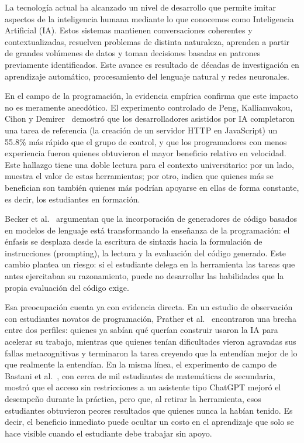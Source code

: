\documentclass[12pt,letterpaper]{article}
\numberwithin{table}{section}
\numberwithin{figure}{section}
\begin{document}
La tecnología actual ha alcanzado un nivel de desarrollo que permite imitar aspectos de la inteligencia humana mediante lo que conocemos como Inteligencia Artificial (IA). Estos sistemas mantienen conversaciones coherentes y contextualizadas, resuelven problemas de distinta naturaleza, aprenden a partir de grandes volúmenes de datos y toman decisiones basadas en patrones previamente identificados. Este avance es resultado de décadas de investigación en aprendizaje automático, procesamiento del lenguaje natural y redes neuronales.

En el campo de la programación, la evidencia empírica confirma que este impacto no es meramente anecdótico. El experimento controlado de Peng, Kalliamvakou, Cihon y Demirer~\cite{peng2023impact} demostró que los desarrolladores asistidos por IA completaron una tarea de referencia (la creación de un servidor HTTP en JavaScript) un 55.8\% más rápido que el grupo de control, y que los programadores con menos experiencia fueron quienes obtuvieron el mayor beneficio relativo en velocidad. Este hallazgo tiene una doble lectura para el contexto universitario: por un lado, muestra el valor de estas herramientas; por otro, indica que quienes más se benefician son también quienes más podrían apoyarse en ellas de forma constante, es decir, los estudiantes en formación.

Becker et al.~\cite{becker2023programming} argumentan que la incorporación de generadores de código basados en modelos de lenguaje está transformando la enseñanza de la programación: el énfasis se desplaza desde la escritura de sintaxis hacia la formulación de instrucciones (prompting), la lectura y la evaluación del código generado. Este cambio plantea un riesgo: si el estudiante delega en la herramienta las tareas que antes ejercitaban su razonamiento, puede no desarrollar las habilidades que la propia evaluación del código exige.

Esa preocupación cuenta ya con evidencia directa. En un estudio de observación con estudiantes novatos de programación, Prather et al.~\cite{prather2024widening} encontraron una brecha entre dos perfiles: quienes ya sabían qué querían construir usaron la IA para acelerar su trabajo, mientras que quienes tenían dificultades vieron agravadas sus fallas metacognitivas y terminaron la tarea creyendo que la entendían mejor de lo que realmente la entendían. En la misma línea, el experimento de campo de Bastani et al.~\cite{bastani2025generative}, con cerca de mil estudiantes de matemáticas de secundaria, mostró que el acceso sin restricciones a un asistente tipo ChatGPT mejoró el desempeño durante la práctica, pero que, al retirar la herramienta, esos estudiantes obtuvieron peores resultados que quienes nunca la habían tenido. Es decir, el beneficio inmediato puede ocultar un costo en el aprendizaje que solo se hace visible cuando el estudiante debe trabajar sin apoyo.
\end{document}
